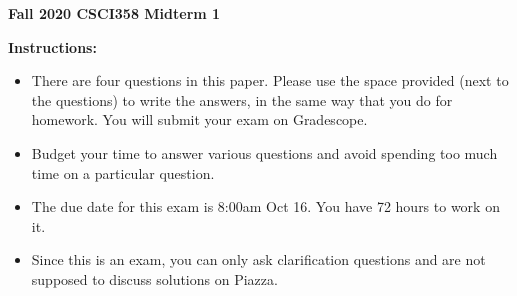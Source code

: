 \documentclass[12pt,twoside]{article}
\renewcommand{\baselinestretch}{1.2}
\begin{document}
%
\setcounter{page}{0}
\begin{center}
{\bf Fall 2020 CSCI358 Midterm 1}
\end{center}
%
\noindent
{\bf Instructions:} \\
%
\begin{itemize}
%
\item There are four questions in this paper. Please use the space provided
      (next to the questions) to write the answers, in the same way that you do for homework. You will submit your exam on Gradescope.
%
\item Budget your time to answer various questions and avoid spending
      too much time on a particular question.
\item The due date for this exam is 8:00am Oct 16. You have 72 hours to work on it.
\item Since this is an exam, you can only ask clarification questions and are not supposed to discuss solutions on Piazza.
%

\end{itemize}
%

\renewcommand{\baselinestretch}{2.0}
\normalsize

\renewcommand{\baselinestretch}{1.2}
\normalsize

\end{document}
